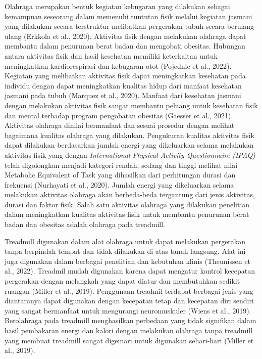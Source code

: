 Olahraga merupakan bentuk kegiatan kebugaran yang dilakukan sebagai kemampuan seseorang dalam memenuhi tuntutan fisik melalui kegiatan jasmani yang dilakukan secara terstruktur melibatkan pergerakan tubuh secara berulang-ulang (Erkkola et al., 2020). Aktivitas fisik dengan melakukan olahraga dapat membantu dalam penurunan berat badan dan mengobati obesitas. Hubungan antara aktivitas fisik dan hasil kesehatan memiliki keterkaitan untuk meningkatkan kardiorespirasi dan kebugaran otot (Pojednic et al., 2022). Kegiatan yang melibatkan aktivitas fisik dapat meningkatkan kesehatan pada individu dengan dapat meningkatkan kualitas hidup dari manfaat kesehatan jasmani pada tubuh (Marquez et al., 2020). Manfaat dari kesehatan jasmani dengan melakukan aktivitas fisik sangat membantu peluang untuk kesehatan fisik dan mental terhadap program pengobatan obesitas (Gaesser et al., 2021). Aktivitas olahraga dinilai bermanfaat dan sesuai prosedur dengan melihat bagaimana kualitas olahraga yang dilakukan. Pengukuran kualitas aktivitas fisik dapat dilakukan berdasarkan jumlah energi yang dikeluarkan selama melakukan aktivitas fisik yang dengan \emph{International Physical Activity Questionnaire (IPAQ)} telah digolongkan menjadi kategori rendah, sedang dan tinggi melihat nilai Metabolic Equivalent of Task yang dihasilkan dari perhitungan durasi dan frekuensi (Nurhayati et al., 2020). Jumlah energi yang dikeluarkan selama melakukan aktivitas olahraga akan berbeda-beda tergantung dari jenis aktivitas, durasi dan faktor fisik. Salah satu aktivitas olahraga yang dilakukan penelitian dalam meningkatkan kualitas aktivitas fisik untuk membantu penurunan berat badan dan obesitas adalah olahraga pada treadmill.

Treadmill digunakan dalam alat olahraga untuk dapat melakukan pergerakan tanpa berpindah tempat dan tidak dilakukan di atas tanah langsung. Alat ini juga digunakan dalam berbagai penelitian dan kebutuhan klinis (Theunissen et al., 2022). Treadmil mudah digunakan karena dapat mengatur kontrol kecepatan pergerakan dengan melangkah yang dapat diatur dan membutuhkan sedikit ruangan (Miller et al., 2019). Penggunaan treadmil terdapat berbagai jenis yang diantaranya dapat digunakan dengan kecepatan tetap dan kecepatan diri sendiri yang sangat bermanfaat untuk mengurangi neuromuskuler (Wiens et al., 2019). Berolahraga pada treadmill menghasilkan perbedaan yang tidak signifikan dalam hasil pembakaran energi dan kalori dengan melakukan olahraga tanpa treadmill yang membuat treadmill sangat digemari untuk digunakan sehari-hari (Miller et al., 2019).

